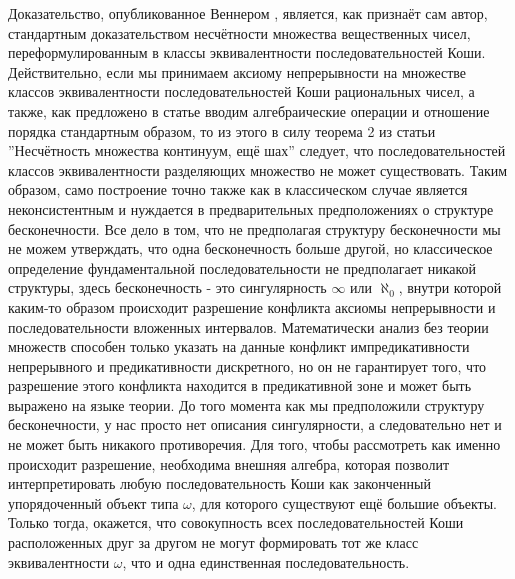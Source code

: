 \documentclass[12pt]{article}
\begin{document}
Доказательство, опубликованное Веннером \cite{wenner}, является, как признаёт сам автор, стандартным доказательством несчётности множества вещественных чисел, переформулированным в классы эквивалентности последовательностей Коши. Действительно, если мы принимаем аксиому непрерывности на множестве классов эквивалентности последовательностей Коши рациональных чисел, а также, как предложено в статье вводим алгебраические операции и отношение порядка стандартным образом, то из этого в силу теорема 2 из статьи ''Несчётность множества континуум, ещё шах'' следует, что последовательностей классов эквивалентности разделяющих множество не может существовать. Таким образом, само построение точно также как в классическом случае является неконсистентным и нуждается в предварительных предположениях о структуре бесконечности. Все дело в том, что не предполагая структуру бесконечности мы не можем утверждать, что одна бесконечность больше другой, но классическое определение фундаментальной последовательности не предполагает никакой структуры, здесь бесконечность - это сингулярность $\infty$ или $\aleph_0$, внутри которой каким-то образом происходит разрешение конфликта аксиомы непрерывности и последовательности вложенных интервалов. Математически анализ без теории множеств способен только указать на данные конфликт импредикативности непрерывного и предикативности дискретного, но он не гарантирует того, что разрешение этого конфликта находится в предикативной зоне и может быть выражено на языке теории. До того момента как мы предположили структуру бесконечности, у нас просто нет описания сингулярности, а следовательно нет и не может быть никакого противоречия. Для того, чтобы рассмотреть как именно происходит разрешение, необходима внешняя алгебра, которая позволит интерпретировать любую последовательность Коши как законченный упорядоченный объект типа $\omega$, для которого существуют ещё большие объекты. Только тогда, окажется, что совокупность всех последовательностей Коши расположенных друг за другом не могут формировать тот же класс эквивалентности $\omega$, что и одна единственная последовательность.
\end{document}
